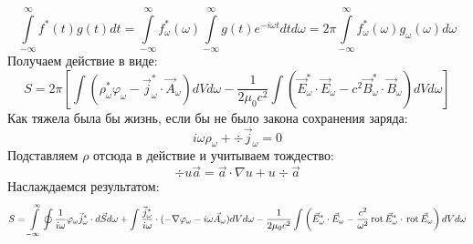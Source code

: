 \[
	\int\limits_{-\infty}^{\infty} f^*(t) g(t) dt = 
	\int\limits_{-\infty}^{\infty} f^*_\omega(\omega)  \int\limits_{-\infty}^{\infty} g(t) e^{- i\omega t} dt d\omega =
	2\pi \int\limits_{-\infty}^{\infty} f^*_\omega(\omega) g_\omega(\omega) d\omega
\]
Получаем действие в виде:
\[
	S = 2\pi \left[ \int (\rho^*_\omega \varphi_\omega - \vec{j}^*_\omega\cdot\vec{A}_\omega) dV d\omega- \frac{1}{2\mu_0c^2} \int (\vec{E}^*_\omega\cdot\vec{E}_\omega - c^2 \vec{B}^*_\omega \cdot \vec{B}_\omega) dV d\omega \right]
\]
Как тяжела была бы жизнь, если бы не было закона сохранения заряда:
\[
	i\omega \rho_\omega + \div \vec{j}_\omega = 0
\]
Подставляем $\rho$ отсюда в действие и учитываем тождество:
\[
	\div u \vec{a} = \vec{a} \cdot \nabla u + u \div \vec{a}
\]
Наслаждаемся результатом:
\[
	S = \int\limits_{-\infty}^{\infty}\oint \frac{1}{i\omega} \varphi_\omega \vec{j}^*_\omega \cdot d\vec{S} d\omega +
	\int \frac{\vec{j}^*_\omega}{i\omega}  \cdot (- \nabla\varphi_\omega - i\omega\vec{A}_\omega) dV d\omega - \frac{1}{2\mu_0c^2} \int \left(\vec{E}^*_\omega\cdot\vec{E}_\omega - \frac{c^2}{\omega^2} \,\mathrm{rot}\,\vec{E}^*_\omega \cdot \,\mathrm{rot}\,\vec{E}_\omega\right) dV d\omega
\]

